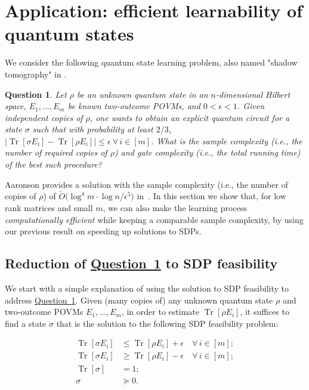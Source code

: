 \documentclass[a4paper,UKenglish,cleveref, autoref]{lipics-v2019}
\newtheorem{question}[theorem]{Question}
\theoremstyle{remark}
\numberwithin{equation}{section}
\numberwithin{oracle}{section}
\numberwithin{remark}{section}
\newcommand{\ques}[1]{\hyperref[ques:#1]{Question~\ref*{ques:#1}}}
\newcommand{\range}[1]{[#1]}
\DeclareMathOperator{\Tr}{Tr}
\begin{document}

\section{Application: efficient learnability of quantum states} \label{append:learn}

We consider the following quantum state learning problem, also named "shadow tomography" in \cite{aaronson2017quantum}.

\begin{question}\label{ques:shadow-tomography}
Let $\rho$ be an unknown quantum state in an $n$-dimensional Hilbert space, $E_{1},\ldots,E_{m}$ be known two-outcome POVMs, and $0<\epsilon<1$. Given independent copies of $\rho$, one wants to obtain an explicit quantum circuit for a state $\sigma$ such that with probability at least $2/3$, $|\Tr[\sigma E_{i}]-\Tr[\rho E_{i}]|\leq\epsilon\ \forall\,i\in\range{m}$. What is the sample complexity (i.e., the number of required copies of $\rho$) and gate complexity (i.e., the total running time) of the best such procedure?
\end{question}

Aaronson provides a solution with the sample complexity (i.e., the number of copies of $\rho$) of $\tilde{O}\big(\log^{4}m\cdot\log n/\epsilon^{5}\big)$ in~\cite{aaronson2017quantum}. In this section we show that, for low rank matrices and small $m$, we can also make the learning process \textit{computationally efficient} while keeping a comparable sample complexity,  by using our previous result on speeding up solutions to SDPs.

\subsection{Reduction of \ques{shadow-tomography} to SDP feasibility}
We start with a simple explanation of using the solution to SDP feasibility to address \ques{shadow-tomography}. Given (many copies of) any unknown quantum state $\rho$ and two-outcome POVMs $E_{1},\ldots,E_{m}$, in order to estimate $\Tr[\rho E_{i}]$, it suffices to find a state $\sigma$ that is the solution to the following SDP feasibility problem:

\begin{align}
\Tr[\sigma E_{i}]&\leq\Tr[\rho E_{i}]+\epsilon\quad\forall\,i\in\range{m}; \label{eqn:SDP-shadow-1} \\
\Tr[\sigma E_{i}]&\geq\Tr[\rho E_{i}]-\epsilon\quad\forall\,i\in\range{m}; \label{eqn:SDP-shadow-2} \\
\Tr[\sigma]&=1; \label{eqn:SDP-shadow-3} \\
\sigma&\succeq 0. \label{eqn:SDP-shadow-4}
\end{align}
\end{document}
